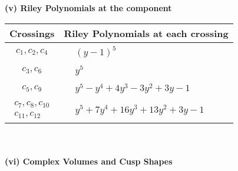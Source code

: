 \documentclass[1p]{elsarticle_modified}
\theoremstyle{definition}
\begin{document}
\newpage\renewcommand{\arraystretch}{1}
\flushleft \textbf{(v) Riley Polynomials at the component}\newline \\
\begin{tabular}{m{50pt}|m{274pt}}
Crossings & \hspace{64pt}Riley Polynomials at each crossing \\
\hline $$\begin{aligned}c_{1},c_{2},c_{4}\end{aligned}$$&$\begin{aligned}
&(y-1)^5
\end{aligned}$\\
\hline $$\begin{aligned}c_{3},c_{6}\end{aligned}$$&$\begin{aligned}
&y^5
\end{aligned}$\\
\hline $$\begin{aligned}c_{5},c_{9}\end{aligned}$$&$\begin{aligned}
&y^5- y^4+4 y^3-3 y^2+3 y-1
\end{aligned}$\\
\hline $$\begin{aligned}c_{7},c_{8},c_{10}\\c_{11},c_{12}\end{aligned}$$&$\begin{aligned}
&y^5+7 y^4+16 y^3+13 y^2+3 y-1
\end{aligned}$\\
\hline
\end{tabular}\\~\\
\newpage\flushleft \textbf{(vi) Complex Volumes and Cusp Shapes}
\end{document}
